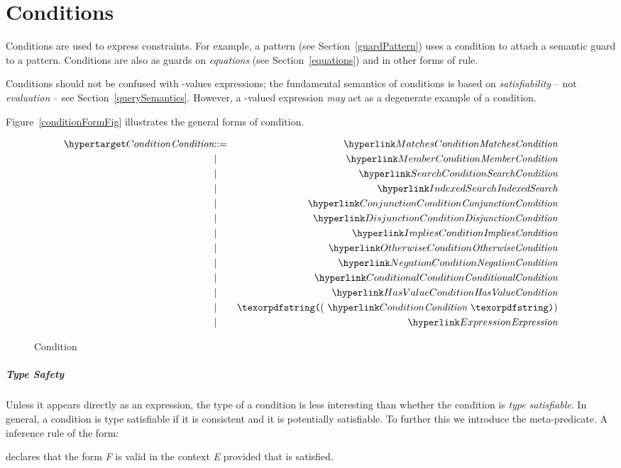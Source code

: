 \chapter{Conditions}
\label{conditions}
Conditions are used to express constraints. For example, a  pattern (see Section~\vref{guardPattern}) uses a condition to attach a semantic guard to a pattern. Conditions are also as guards on \emph{equations} (see Section~\vref{equations}) and in other forms of rule.


\begin{aside}
Conditions should not be confused with -values expressions; the fundamental semantics of conditions is based on \emph{satisfiability} -- not \emph{evaluation} -- see Section~\vref{querySemantics}. However, a -valued expression \emph{may} act as a degenerate example of a condition.
\end{aside}

Figure~\vref{conditionFormFig} illustrates the general forms of condition. 

\begin{figure}[htbp]
\begin{eqnarray*}
\ntDef{Condition}&\arrow&\ntRef{MatchesCondition}\\
&\choice&\ntRef{MemberCondition}\\
&\choice&\ntRef{SearchCondition}\\
&\choice&\ntRef{IndexedSearch}\\
&\choice&\ntRef{ConjunctionCondition}\\
&\choice&\ntRef{DisjunctionCondition}\\
&\choice&\ntRef{ImpliesCondition}\\
&\choice&\ntRef{OtherwiseCondition}\\
&\choice&\ntRef{NegationCondition}\\
&\choice&\ntRef{ConditionalCondition}\\
&\choice&\ntRef{HasValueCondition}\\
&\choice&\q{(}\ \ntRef{Condition}\ \q{)}\\
&\choice&\ntRef{Expression}
\end{eqnarray*}
\caption{Condition}
\label{conditionFormFig}
\end{figure}

\paragraph{Type Safety}
Unless it appears directly as an expression, the type of a condition is less interesting than whether the condition is \emph{type satisfiable}. In general, a condition is type satisfiable if it is consistent and it is potentially satisfiable. To further this we introduce the \satinf{} meta-predicate. A inference rule of the form:
\begin{prooftree}
\end{prooftree}
declares that the form \emph{F} is valid in the context \emph{E} provided that  is satisfied.

